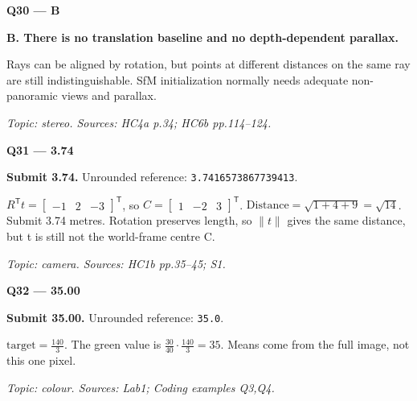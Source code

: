 \documentclass[11pt,a4paper]{article}
\begin{document}
\par\vspace{12pt}
\begin{minipage}{\linewidth}
\textbf{Q30 — B}\par\smallskip
\textbf{B. There is no translation baseline and no depth-dependent parallax.}\par
Rays can be aligned by rotation,\allowbreak{} but points at different distances on the same ray are still indistinguishable. SfM initialization normally needs adequate non-panoramic views and parallax.\par
{\small\itshape Topic: stereo. Sources: HC4a p.34; HC6b pp.114–124.}

\end{minipage}
\par\vspace{12pt}
\begin{minipage}{\linewidth}
\textbf{Q31 — 3.74}\par\smallskip
\textbf{Submit 3.74.} Unrounded reference: \texttt{3.7416573867739413}.\par
\(R^{\mathsf T}t=\begin{bmatrix}-1&2&-3\end{bmatrix}^{\mathsf T}\),\allowbreak{} so \(C=\begin{bmatrix}1&-2&3\end{bmatrix}^{\mathsf T}\). \(\text{Distance}=\sqrt{1+4+9}=\sqrt{14}\). Submit 3.74 metres. Rotation preserves length,\allowbreak{} so \(\lVert t\rVert\) gives the same distance,\allowbreak{} but t is still not the world-frame centre C.\par
{\small\itshape Topic: camera. Sources: HC1b pp.35–45; S1.}

\end{minipage}
\par\vspace{12pt}
\begin{minipage}{\linewidth}
\textbf{Q32 — 35.00}\par\smallskip
\textbf{Submit 35.00.} Unrounded reference: \texttt{35.0}.\par
\(\text{target}=\frac{140}{3}\). The green value is \(\frac{30}{40}\cdot\frac{140}{3}=35\). Means come from the full image,\allowbreak{} not this one pixel.\par
{\small\itshape Topic: colour. Sources: Lab1; Coding examples Q3,\allowbreak{}Q4.}

\end{minipage}
\par\vspace{12pt}
\end{document}
